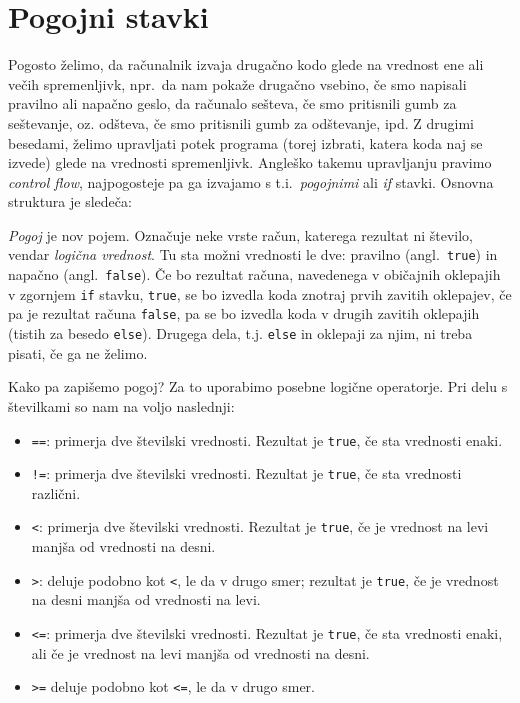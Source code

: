 \documentclass{book}
\begin{document}
\chapter{Pogojni stavki}

Pogosto želimo, da računalnik izvaja drugačno kodo glede na vrednost ene ali
večih spremenljivk, npr.~da nam pokaže drugačno vsebino, če smo napisali
pravilno ali napačno geslo, da računalo sešteva, če smo pritisnili gumb za
seštevanje, oz. odšteva, če smo pritisnili gumb za odštevanje, ipd. Z drugimi
besedami, želimo upravljati potek programa (torej izbrati, katera koda naj
se izvede) glede na vrednosti spremenljivk. Angleško takemu upravljanju
pravimo \emph{control flow}, najpogosteje pa ga izvajamo s t.i.~\emph{pogojnimi}
ali \emph{if} stavki. Osnovna struktura je sledeča:

\begin{examples}


\end{examples}

\emph{Pogoj} je nov pojem. Označuje neke vrste račun, katerega rezultat ni
število, vendar \emph{logična vrednost}. Tu sta možni vrednosti le dve:
pravilno (angl.~\verb+true+) in napačno (angl.~\verb+false+). Če bo rezultat
računa, navedenega v običajnih oklepajih v zgornjem \verb+if+ stavku,
\verb+true+,
se bo izvedla koda znotraj prvih zavitih oklepajev, če pa je rezultat računa
\verb+false+, pa se bo izvedla koda v drugih zavitih oklepajih (tistih za besedo
\verb+else+). Drugega dela, t.j. \verb+else+ in oklepaji za njim, ni treba
pisati, če ga ne želimo.

Kako pa zapišemo pogoj? Za to uporabimo posebne logične operatorje. Pri delu s
številkami so nam na voljo naslednji:
\begin{itemize}
  \item \verb+==+: primerja dve številski vrednosti.
	Rezultat je \verb+true+, če sta vrednosti enaki.
  \item \verb+!=+: primerja dve številski vrednosti.
	Rezultat je \verb+true+, če sta vrednosti različni.
  \item \verb+<+: primerja dve številski vrednosti.
	Rezultat je \verb+true+, če je vrednost na levi manjša od vrednosti na desni.
  \item \verb+>+: deluje podobno kot \verb+<+, le da v drugo smer;
	rezultat je \verb+true+, če je vrednost na desni manjša od vrednosti na levi.
  \item \verb+<=+: primerja dve številski vrednosti.
	Rezultat je \verb+true+, če sta vrednosti enaki, ali če je vrednost
	na levi manjša od vrednosti na desni.
  \item \verb+>=+ deluje podobno kot \verb+<=+, le da v drugo smer.
\end{itemize}
\end{document}
